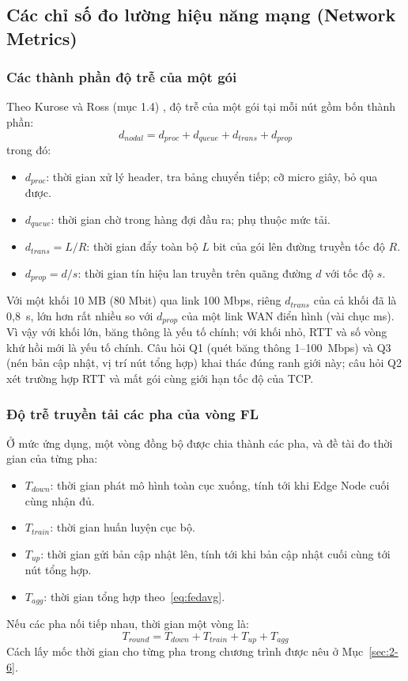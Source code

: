 \subsection{Các chỉ số đo lường hiệu năng mạng (Network Metrics)}
\label{sec:1-4}

\subsubsection{Các thành phần độ trễ của một gói}
Theo Kurose và Ross (mục 1.4) \cite{kurose2021computer}, độ trễ của một gói tại mỗi nút gồm bốn thành phần:
\begin{equation}
    d_{nodal} = d_{proc} + d_{queue} + d_{trans} + d_{prop}
    \label{eq:dnodal}
\end{equation}
trong đó:
\begin{itemize}
    \item $d_{proc}$: thời gian xử lý header, tra bảng chuyển tiếp; cỡ micro giây, bỏ qua được.
    \item $d_{queue}$: thời gian chờ trong hàng đợi đầu ra; phụ thuộc mức tải.
    \item $d_{trans} = L/R$: thời gian đẩy toàn bộ $L$ bit của gói lên đường truyền tốc độ $R$.
    \item $d_{prop} = d/s$: thời gian tín hiệu lan truyền trên quãng đường $d$ với tốc độ $s$.
\end{itemize}

Với một khối 10 MB (80 Mbit) qua link 100 Mbps, riêng $d_{trans}$ của cả khối đã là 0{,}8~s, lớn hơn rất nhiều so với $d_{prop}$ của một link WAN điển hình (vài chục ms). Vì vậy với khối lớn, băng thông là yếu tố chính; với khối nhỏ, RTT và số vòng khứ hồi mới là yếu tố chính. Câu hỏi Q1 (quét băng thông 1--100~Mbps) và Q3 (nén bản cập nhật, vị trí nút tổng hợp) khai thác đúng ranh giới này; câu hỏi Q2 xét trường hợp RTT và mất gói cùng giới hạn tốc độ của TCP.

\subsubsection{Độ trễ truyền tải các pha của vòng FL}
Ở mức ứng dụng, một vòng đồng bộ được chia thành các pha, và đề tài đo thời gian của từng pha:
\begin{itemize}
    \item $T_{down}$: thời gian phát mô hình toàn cục xuống, tính tới khi Edge Node cuối cùng nhận đủ.
    \item $T_{train}$: thời gian huấn luyện cục bộ.
    \item $T_{up}$: thời gian gửi bản cập nhật lên, tính tới khi bản cập nhật cuối cùng tới nút tổng hợp.
    \item $T_{agg}$: thời gian tổng hợp theo~\eqref{eq:fedavg}.
\end{itemize}
Nếu các pha nối tiếp nhau, thời gian một vòng là:
\begin{equation}
    T_{round} = T_{down} + T_{train} + T_{up} + T_{agg}
    \label{eq:tround}
\end{equation}
Cách lấy mốc thời gian cho từng pha trong chương trình được nêu ở Mục~\ref{sec:2-6}.

